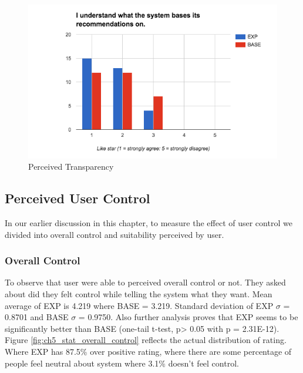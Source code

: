 \begin{figure}[h]
	\centering
	\includegraphics[width=1\linewidth]{figures/ch5_stat_transpancy.png}
	\caption{Perceived Transparency}
	\label{fig:ch5_stat_transpancy}
\end{figure}

\subsection{Perceived User Control}

In our earlier discussion in this chapter, to measure the effect of user control we divided into overall control and suitability perceived by user. 

\subsubsection{Overall Control}

To observe that user were able to perceived overall control or not. They asked about did they felt control while telling the system what they want.  Mean average of EXP is 4.219 where BASE = 3.219. Standard deviation of EXP ${\sigma}$ = 0.8701 and BASE ${\sigma}$ = 0.9750. Also further analysis proves that EXP seems to be significantly better than BASE (one-tail t-test, p> 0.05 with p = 2.31E-12). Figure \ref{fig:ch5_stat_overall_control} reflects the actual distribution of rating. Where EXP has 87.5\% over positive rating, where there are some percentage of people feel neutral about system where 3.1\% doesn’t feel control.

